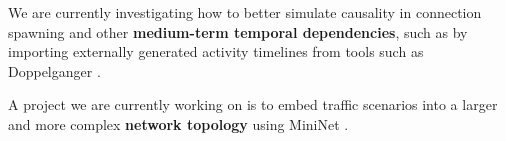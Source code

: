 We are currently investigating how to better simulate causality in connection spawning and other \textbf{medium-term temporal dependencies}, such as by importing externally generated activity timelines from tools such as Doppelganger \cite{lin2019generating}. 

A project we are currently working on is to embed traffic scenarios into a larger and more complex \textbf{network topology} using MiniNet \cite{lantz2010network}.









